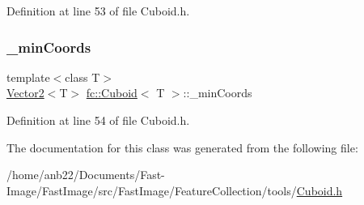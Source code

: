Definition at line 53 of file Cuboid.\+h.

\mbox{\label{classfc_1_1Cuboid_a79231769f23e7ebeb5769e789ff5d90c}} 
\subsubsection{\texorpdfstring{\+\_\+min\+Coords}{\_minCoords}}
{\footnotesize\ttfamily template$<$class T$>$ \\
\hyperlink{classfc_1_1Vector2}{Vector2}$<$T$>$ \hyperlink{classfc_1_1Cuboid}{fc\+::\+Cuboid}$<$ T $>$\+::\+\_\+min\+Coords\hspace{0.3cm}{\ttfamily [private]}}



Definition at line 54 of file Cuboid.\+h.



The documentation for this class was generated from the following file\+:\begin{DoxyCompactItemize}
\item 
/home/anb22/\+Documents/\+Fast-\/\+Image/\+Fast\+Image/src/\+Fast\+Image/\+Feature\+Collection/tools/\hyperlink{Cuboid_8h}{Cuboid.\+h}\end{DoxyCompactItemize}
